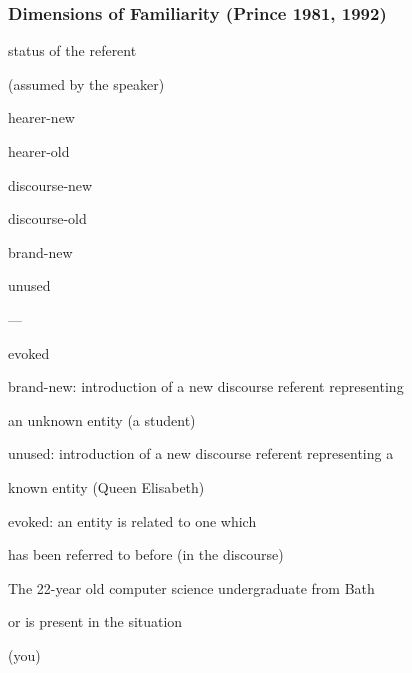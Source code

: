 \documentclass[compress,color=usenames]{beamer}
\begin{document}
\begin{frame}
\frametitle{
Dimensions of Familiarity (Prince 1981, 1992)}



status of the referent



(assumed by the speaker)



hearer-new



hearer-old






discourse-new






discourse-old






brand-new



unused





---



evoked






brand-new: introduction of a new discourse referent representing



an unknown entity (a student)



unused: introduction of a new discourse referent representing a



known entity (Queen Elisabeth)



evoked: an entity is related to one which



has been referred to before (in the discourse)



The 22-year old computer science undergraduate from Bath



or is present in the situation



(you)










\end{frame}
\end{document}
